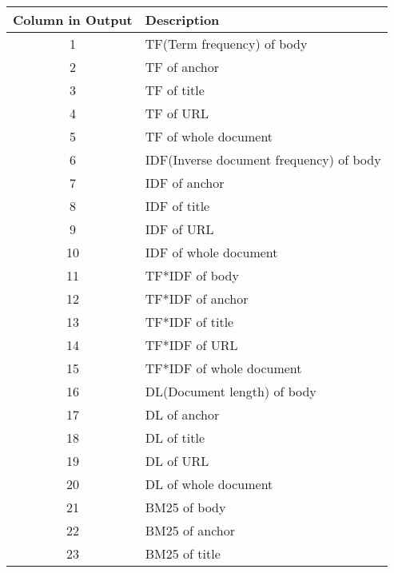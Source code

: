 \begin{longtable}{|c|l|}
\hline
Column in Output & Description                             \\ \hline
1                & TF(Term frequency) of body              \\ \hline
2                & TF of anchor                            \\ \hline
3                & TF of title                             \\ \hline
4                & TF of URL                               \\ \hline
5                & TF of whole document                    \\ \hline
6                & IDF(Inverse document frequency) of body \\ \hline
7                & IDF of anchor                           \\ \hline
8                & IDF of title                            \\ \hline
9                & IDF of URL                              \\ \hline
10               & IDF of whole document                   \\ \hline
11               & TF*IDF of body                          \\ \hline
12               & TF*IDF of anchor                        \\ \hline
13               & TF*IDF of title                         \\ \hline
14               & TF*IDF of URL                           \\ \hline
15               & TF*IDF of whole document                \\ \hline
16               & DL(Document length) of body             \\ \hline
17               & DL of anchor                            \\ \hline
18               & DL of title                             \\ \hline
19               & DL of URL                               \\ \hline
20               & DL of whole document                    \\ \hline
21               & BM25 of body                            \\ \hline
22               & BM25 of anchor                          \\ \hline
23               & BM25 of title                           \\ \hline

\end{longtable}
